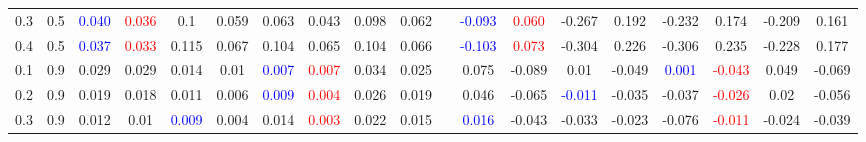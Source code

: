 \documentclass[specialist,
substylefile = spbu_report.rtx,
subf,href,colorlinks=true, 12pt]{disser}
\theoremstyle{definition}
\begin{document}
\begin{table}
{\begin{tabular}{m{1cm}m{1cm}ccccccccm{0.2cm}cccccccc}
			0.3 & 0.5    & \textcolor{blue}{0.040}                 & \textcolor{red}{0.036}                     & 0.1                                 & 0.059                       & 0.063                   & 0.043                                   & 0.098                                      & 0.062                    &                             & \textcolor{blue}{-0.093} & \textcolor{red}{0.060} & -0.267                   & 0.192      & -0.232                   & 0.174                   & -0.209                   & 0.161                  \\
			0.4 & 0.5    & \textcolor{blue}{0.037}                 & \textcolor{red}{0.033}                     & 0.115                               & 0.067                       & 0.104                   & 0.065                                   & 0.104                                      & 0.066                    &                             & \textcolor{blue}{-0.103} & \textcolor{red}{0.073} & -0.304                   & 0.226      & -0.306                   & 0.235                   & -0.228                   & 0.177                  \\
			\hline
			0.1 & 0.9    & 0.029                                   & 0.029                                      & 0.014                               & 0.01                        & \textcolor{blue}{0.007} & \textcolor{red}{0.007}                  & 0.034                                      & 0.025                    &                             & 0.075                    & -0.089                 & 0.01                     & -0.049     & \textcolor{blue}{0.001}  & \textcolor{red}{-0.043} & 0.049                    & -0.069                 \\
			0.2 & 0.9    & 0.019                                   & 0.018                                      & 0.011                               & 0.006                       & \textcolor{blue}{0.009} & \textcolor{red}{0.004}                  & 0.026                                      & 0.019                    &                             & 0.046                    & -0.065                 & \textcolor{blue}{-0.011} & -0.035     & -0.037                   & \textcolor{red}{-0.026} & 0.02                     & -0.056                 \\
			0.3 & 0.9    & 0.012                                   & 0.01                                       & \textcolor{blue}{0.009}             & 0.004                       & 0.014                   & \textcolor{red}{0.003}                  & 0.022                                      & 0.015                    &                             & \textcolor{blue}{0.016}  & -0.043                 & -0.033                   & -0.023     & -0.076                   & \textcolor{red}{-0.011} & -0.024                   & -0.039                 \\

\end{tabular}}
\end{table}
\end{document}
